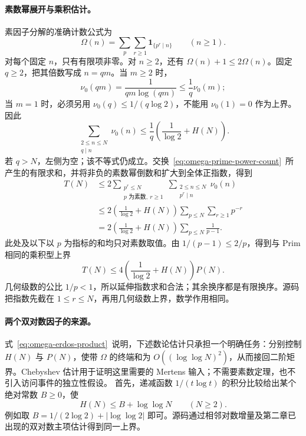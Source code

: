 \paragraph{素数幂展开与乘积估计。}
素因子分解的准确计数公式为
\begin{equation}\label{eq:omega-prime-power-count}
 \Omega(n)=\sum_p\sum_{r\ge1}\mathbf1_{\{p^r\mid n\}}
 \qquad(n\ge1).
\end{equation}
对每个固定 $n$，只有有限项非零。对 $n\ge2$，还有 $\Omega(n)+1\le2\Omega(n)$。固定 $q\ge2$，把其倍数写成 $n=qm$。当 $m\ge2$ 时，
\[
 \nu_0(qm)=\frac1{qm\log(qm)}\le\frac1q\nu_0(m);
\]
当 $m=1$ 时，必须另用 $\nu_0(q)\le1/(q\log2)$，不能用 $\nu_0(1)=0$ 作为上界。因此
\begin{equation}\label{eq:erdos-multiples-bound}
 \sum_{\substack{2\le n\le N\\q\mid n}}\nu_0(n)
 \le\frac1q\left(\frac1{\log2}+H(N)\right).
\end{equation}
若 $q>N$，左侧为空；该不等式仍成立。交换~\eqref{eq:omega-prime-power-count}~所产生的有限求和，并将非负的素数幂倒数和扩大到全体正指数，得到
\begin{align*}
 T(N)&\le2\sum_{\substack{p^r\le N\\p\text{ 为素数},\ r\ge1}}
              \sum_{\substack{2\le n\le N\\p^r\mid n}}\nu_0(n)\\
 &\le2\left(\frac1{\log2}+H(N)\right)
        \sum_{p\le N}\sum_{r\ge1}p^{-r}\\
 &=2\left(\frac1{\log2}+H(N)\right)\sum_{p\le N}\frac1{p-1}.
\end{align*}
此处及以下以 $p$ 为指标的和均只对素数取值。由 $1/(p-1)\le2/p$，得到与 Prim 相同的乘积型上界
\begin{equation}\label{eq:omega-erdos-product}
 \boxed{T(N)\le4\left(\frac1{\log2}+H(N)\right)P(N).}
\end{equation}
几何级数的公比 $1/p<1$，所以延伸指数求和合法；其余换序都是有限换序。源码把指数先截在 $1\le r\le N$，再用几何级数上界，数学作用相同。

\paragraph{两个双对数因子的来源。}
式~\eqref{eq:omega-erdos-product}~说明，下述数论估计只承担一个明确任务：分别控制 $H(N)$ 与 $P(N)$，使带 $\Omega$ 的终端和为 $O((\log\log N)^2)$，从而接回二阶矩界。Chebyshev 估计用于证明这里需要的 Mertens 输入；不需要素数定理，也不引入访问事件的独立性假设。
首先，递减函数 $1/(t\log t)$ 的积分比较给出某个绝对常数 $B\ge0$，使
\begin{equation}\label{eq:erdos-terminal-loglog}
 H(N)\le B+\log\log N\qquad(N\ge2).
\end{equation}
例如取 $B=1/(2\log2)+|\log\log2|$ 即可。源码通过相邻对数增量及第二章已出现的双对数主项估计得到同一上界。

